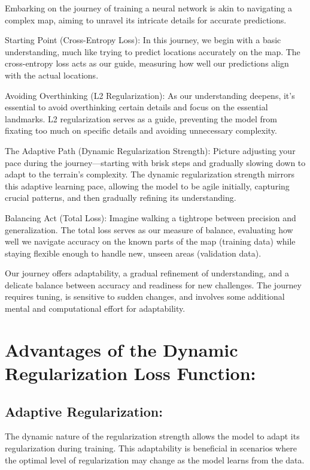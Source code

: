 \documentclass{article}
\begin{document}
Embarking on the journey of training a neural network is akin to navigating a complex map, aiming to unravel its intricate details for accurate predictions.

Starting Point (Cross-Entropy Loss): In this journey, we begin with a basic understanding, much like trying to predict locations accurately on the map. The cross-entropy loss acts as our guide, measuring how well our predictions align with the actual locations.

Avoiding Overthinking (L2 Regularization): As our understanding deepens, it's essential to avoid overthinking certain details and focus on the essential landmarks. L2 regularization serves as a guide, preventing the model from fixating too much on specific details and avoiding unnecessary complexity.

The Adaptive Path (Dynamic Regularization Strength): Picture adjusting your pace during the journey—starting with brisk steps and gradually slowing down to adapt to the terrain's complexity. The dynamic regularization strength mirrors this adaptive learning pace, allowing the model to be agile initially, capturing crucial patterns, and then gradually refining its understanding.

Balancing Act (Total Loss): Imagine walking a tightrope between precision and generalization. The total loss serves as our measure of balance, evaluating how well we navigate accuracy on the known parts of the map (training data) while staying flexible enough to handle new, unseen areas (validation data).

Our journey offers adaptability, a gradual refinement of understanding, and a delicate balance between accuracy and readiness for new challenges. The journey requires tuning, is sensitive to sudden changes, and involves some additional mental and computational effort for adaptability.






\section{Advantages of the Dynamic Regularization Loss Function:}

\subsection{Adaptive Regularization:}
The dynamic nature of the regularization strength allows the model to adapt its regularization during training. This adaptability is beneficial in scenarios where the optimal level of regularization may change as the model learns from the data.
\end{document}
